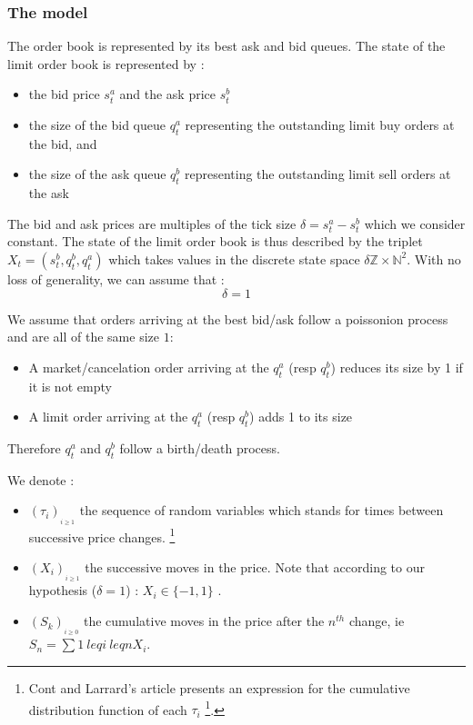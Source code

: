 \documentclass{article}
\begin{document}
\subsubsection{The model}
The order book is represented by its best ask and bid queues. The state of the limit order book is represented by :
\begin{itemize}
\item the bid price $ s_{t}^{a} $ and the ask price $ s_{t}^{b} $ 
\item the size of the bid queue $ q_{t}^{a} $ representing the outstanding limit buy orders at the bid, and 
\item the size of the ask queue $ q_{t}^{b} $ representing the outstanding limit sell orders at the ask 
\end{itemize}
The bid and ask prices are multiples of the tick size $\delta = s_{t}^{a} - s_{t}^{b}$ which we consider constant.
The state of the limit order book is thus described by the triplet $X_{t} = (s_{t}^{b}, q_{t}^{b}, q_{t}^{a})$ which takes values in the discrete state space $\delta \mathbb{Z} \times \mathbb{N}^{2} $. With no loss of generality, we can assume that  :
\begin{equation}
\delta = 1
\end{equation}

We assume that orders arriving at the best bid/ask follow a poissonion process and are all of the same size $1$:
\begin{itemize}
	\item A market/cancelation order arriving at the $q_t^a$ (resp $q_t^b$) reduces its size by 1 if it is not empty
	\item A limit order arriving at the $q_t^a$ (resp $q_t^b$) adds 1 to its size 
\end{itemize}

 Therefore $q_t^a$ and $q_t^b$ follow a birth/death process.

We denote :
\begin{itemize}
\item $(\tau_i)_{_{i \geq 1}}$ the sequence of random variables  which stands for times between successive price changes. \footnote { Cont and Larrard's article presents an expression for the cumulative distribution function of each $\tau_i$ \footnote{See equations (3)-(4) of Cont and Larrard's article}. }
\item $(X_i)_{_{i \geq 1}}$ the successive moves in the price. Note that according to our hypothesis ($\delta = 1$) : $X_i \in \{-1,1\}$ .
\item $(S_k)_{_{i \geq 0}}$ the cumulative moves in the price after the $n^{th}$ change, ie $S_n = \sum{1 \ leq i \ leq n } X_i$.  
\end{itemize}
\end{document}
